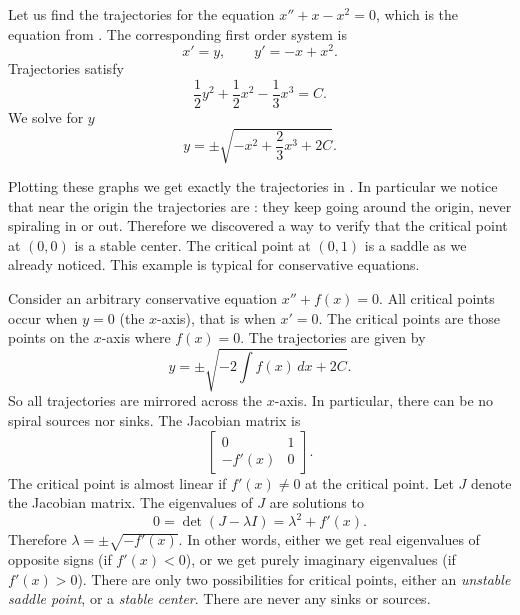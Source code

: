 \documentclass[12pt]{book}
\begin{document}
\begin{example}
Let us find the trajectories for the equation $x'' + x-x^2 = 0$,
which is the equation from
.  The corresponding
first order system is
\begin{equation*}
x' = y , \qquad y' = -x+x^2 .
\end{equation*}
Trajectories satisfy
\begin{equation*}
\frac{1}{2} y^2  + \frac{1}{2} x^2 - \frac{1}{3} x^3  = C .
\end{equation*}
We solve for $y$
\begin{equation*}
y = \pm \sqrt{-x^2 + \frac{2}{3} x^3  + 2C} .
\end{equation*}

Plotting these graphs we get exactly the trajectories in 
.  In particular we notice that near the origin
the trajectories are \emph{}: they keep going
around the origin, never spiraling in or out.  Therefore we discovered a way
to verify that the critical point at $(0,0)$ is a stable center.
The critical point at $(0,1)$ is a saddle as we already noticed.
This example is typical for conservative equations.
\end{example}

Consider an arbitrary
conservative equation $x'' + f(x) = 0$.
All critical points occur when $y=0$ (the
$x$-axis), that is when $x' = 0$.  The critical points are 
those points on the $x$-axis where $f(x) = 0$.
The trajectories are given by
\begin{equation*}
y = \pm \sqrt{ - 2 \int f(x)\, dx + 2C} .
\end{equation*}
So all trajectories are mirrored across the $x$-axis.  In particular,
there can be no spiral sources nor sinks.
The Jacobian matrix is
\begin{equation*}
\begin{bmatrix}
0 & 1 \\
-f'(x) & 0
\end{bmatrix} .
\end{equation*}
The critical point is almost linear if $f'(x) \not= 0$ at the critical 
point.  Let $J$ denote the Jacobian matrix.
The eigenvalues of $J$ are solutions to
\begin{equation*}
0 = \det(J - \lambda I) = \lambda^2 + f'(x) .
\end{equation*}
Therefore $\lambda = \pm \sqrt{-f'(x)}$.  In other words, either we get
real eigenvalues of opposite signs (if $f'(x) < 0$),
or we get purely imaginary eigenvalues (if $f'(x) > 0$).
There are only two possibilities for critical points, either an \emph{unstable
saddle point}, or a \emph{stable center}.
There are never any sinks or sources.
\end{document}
